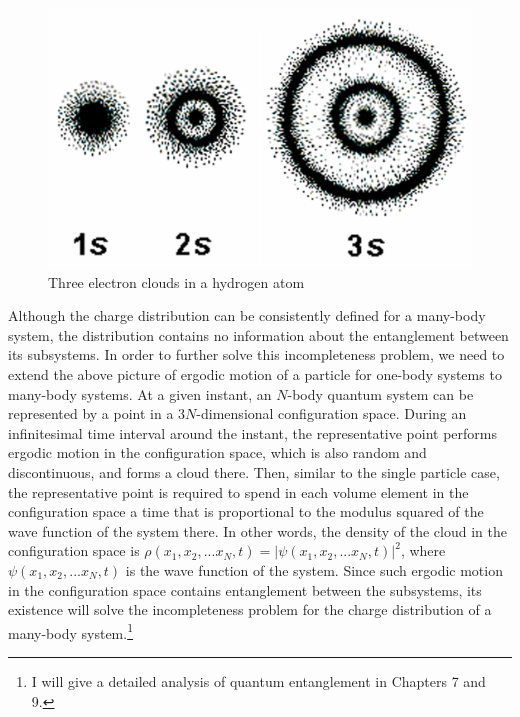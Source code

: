 \begin{center} 
\begin{figure}[h]\label{tec}

\includegraphics[scale=0.39]{fig64.jpg}


\caption{Three electron clouds in a hydrogen atom}

\end{figure}

\end{center} 


Although the charge distribution can be consistently defined for a many-body system, the distribution contains no information about the entanglement between its subsystems.
In order to further solve this incompleteness problem, we need to extend the above picture of ergodic motion of a particle for one-body systems to many-body systems.
At a given instant, an $N$-body quantum system can be represented by a point in a $3N$-dimensional configuration space. During an infinitesimal time interval around the instant, the representative point performs ergodic motion in the configuration space, which is also random and discontinuous, and forms a cloud there. 
Then, similar to the single particle case, the representative point is required to spend in each volume element in the configuration space a time that is proportional to the modulus squared of the wave function of the system there. In other words, the density of the cloud in the configuration space is $\rho(x_1,x_2,...x_N,t)=|\psi(x_1, x_2, ...x_N, t)|^2$, where $\psi(x_1, x_2, ...x_N, t)$ is the wave function of the system. 
Since such ergodic motion in the configuration space contains entanglement between the subsystems, its existence will solve the incompleteness problem for the charge distribution of a many-body system.\footnote{I will give a detailed analysis of quantum entanglement in Chapters 7 and 9.}

